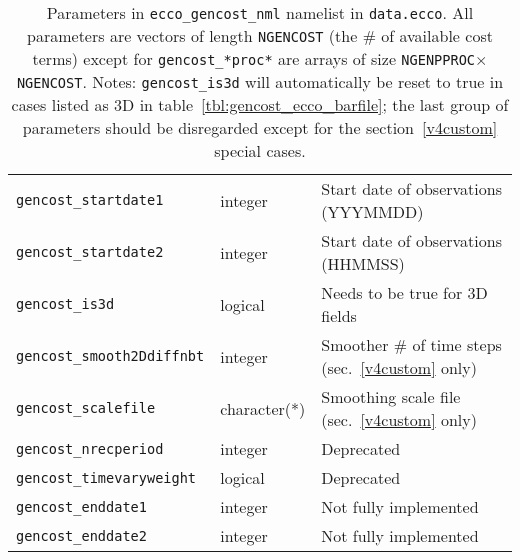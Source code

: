 \begin{table}[!ht]
\begin{tabular}{lll}
\texttt{gencost\_startdate1} 	&	integer			&	Start date of observations (YYYMMDD)	\\
\texttt{gencost\_startdate2} 	&	integer			&	Start date of observations (HHMMSS)				\\
\texttt{gencost\_is3d}		&	logical 		&	Needs to be true for 3D fields \\
\hline
\texttt{gencost\_smooth2Ddiffnbt} &integer		&	Smoother \# of time steps (sec.~\ref{v4custom} only)
\\
\texttt{gencost\_scalefile}	&	character(*)	&	Smoothing scale file (sec.~\ref{v4custom} only)
\\
\texttt{gencost\_nrecperiod} 	&	integer		&	Deprecated	\\
\texttt{gencost\_timevaryweight}&	logical 		&	Deprecated	\\
\texttt{gencost\_enddate1} 		&	integer	&	Not fully implemented \\
\texttt{gencost\_enddate2} 		&	integer	&	Not fully implemented \\
\end{tabular}
\caption{Parameters in \texttt{ecco\_gencost\_nml} namelist in \texttt{data.ecco}. All parameters are vectors of length \texttt{NGENCOST} (the \# of available cost terms) except for \texttt{gencost\_*proc*} are arrays of size \texttt{NGENPPROC}$\times$\texttt{NGENCOST}. Notes: \texttt{gencost\_is3d} will automatically be reset to true in cases listed as 3D in table~\ref{tbl:gencost_ecco_barfile}; the last group of parameters should be disregarded except for the section~\ref{v4custom} special cases.}
\label{tbl:gencost_ecco_params}
\end{table}


